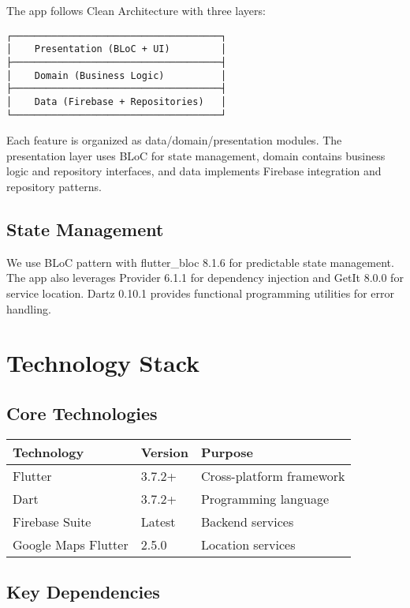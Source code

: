 \documentclass[12pt,a4paper]{article}
\begin{document}
The app follows Clean Architecture with three layers:

\begin{lstlisting}
┌─────────────────────────────────────┐
│    Presentation (BLoC + UI)         │
├─────────────────────────────────────┤
│    Domain (Business Logic)          │
├─────────────────────────────────────┤
│    Data (Firebase + Repositories)   │
└─────────────────────────────────────┘
\end{lstlisting}

Each feature is organized as data/domain/presentation modules. The presentation layer uses BLoC for state management, domain contains business logic and repository interfaces, and data implements Firebase integration and repository patterns.

\subsection{State Management}

We use BLoC pattern with flutter\_bloc 8.1.6 for predictable state management. The app also leverages Provider 6.1.1 for dependency injection and GetIt 8.0.0 for service location. Dartz 0.10.1 provides functional programming utilities for error handling.

\section{Technology Stack}

\subsection{Core Technologies}
\begin{table}[H]
\centering
\begin{tabular}{|l|l|l|}
\hline
\textbf{Technology} & \textbf{Version} & \textbf{Purpose} \\
\hline
Flutter & 3.7.2+ & Cross-platform framework \\
Dart & 3.7.2+ & Programming language \\
Firebase Suite & Latest & Backend services \\
Google Maps Flutter & 2.5.0 & Location services \\
\hline
\end{tabular}
\end{table}

\subsection{Key Dependencies}
\end{document}
